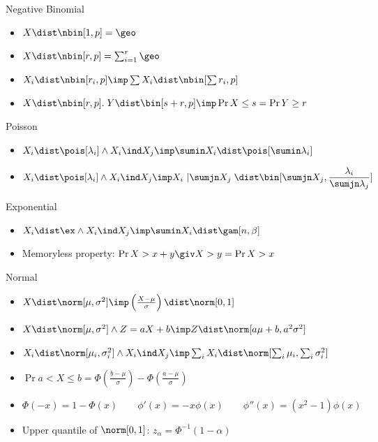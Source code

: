 \documentclass[landscape]{article}
\begin{document}
\begin{multicols*}{2}
Negative Binomial
\begin{itemize}
  \item $ X\dist \nbin[1,p] = \geo $
  \item $ X\dist \nbin[r,p] = \sum_{i=1}^r \geo $
  \item $X_i\dist \nbin[r_i,p] \imp \sum X_i\dist \nbin[\sum r_i,p] $
  \item $X\dist \nbin[r,p].\; Y\dist \bin[s+r,p] \imp \Pr{X\le s} = \Pr{Y\ge r}$
\end{itemize}

Poisson
\begin{itemize}
  \item $X_i\dist\pois[\lambda_i] \wedge X_i \ind X_j
    \imp \displaystyle\sumin X_i \dist \pois[\displaystyle\sumin \lambda_i]$
  \item $X_i\dist\pois[\lambda_i] \wedge X_i \ind X_j
    \imp X_i\,\left|\displaystyle\sumjn X_j\right. \dist
   \bin[\displaystyle\sumjn X_j,\displaystyle\frac{\lambda_i}{\sumjn\lambda_j}]$
\end{itemize}

Exponential
\begin{itemize}
  \item $X_i\dist\ex \wedge  X_i \ind X_j
    \imp \displaystyle\sumin X_i\dist \gam[n,\beta]$
  \item Memoryless property: $\Pr{X>x+y\giv X>y}=\Pr{X>x}$
\end{itemize}

Normal
\begin{itemize}
  \item $X\dist \norm[\mu,\sigma^2]
    \imp \left(\frac{X-\mu}{\sigma}\right)\dist\norm[0,1] $
  \item $X\dist \norm[\mu,\sigma^2] \wedge Z = aX+b
    \imp Z\dist\norm[a\mu+b,a^2\sigma^2] $
  \item $X_i\dist\norm[\mu_i,\sigma_i^2] \wedge X_i \ind X_j
     \imp \sum_i X_i \dist \norm[\sum_i\mu_i,\sum_i\sigma_i^2]$
   \item $\Pr{a < X \le b}= \Phi\left(\frac{b-\mu}{\sigma}\right)
     - \Phi\left(\frac{a-\mu}{\sigma}\right) $
  \item $\Phi(-x) = 1 - \Phi(x) \qquad \phi'(x) = -x\phi(x) \qquad
    \phi''(x) = (x^2-1)\phi(x)$
  \item Upper quantile of $\norm[0,1]$: $z_{\alpha} = \Phi^{-1}(1-\alpha)$
\end{itemize}


\end{multicols*}
\end{document}
